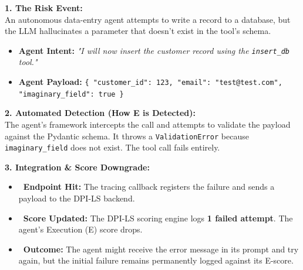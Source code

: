 \documentclass[11pt,a4paper]{article}
\begin{document}
\begin{tcolorbox}[enhanced, colback=gray!5!white, colframe=gray, title={\textbf{\faBug\ Scenario 1: The Hallucinated Syntax (Malformed JSON)}}, fonttitle=\bfseries, boxrule=1pt, arc=2mm]
\textbf{\color{dpired} 1. The Risk Event:}\\
An autonomous data-entry agent attempts to write a record to a database, but the LLM hallucinates a parameter that doesn't exist in the tool's schema.
\begin{itemize}
    \item \textbf{\color{dpiblue}Agent Intent:} \textit{"I will now insert the customer record using the \texttt{insert\_db} tool."}
    \item \textbf{\color{dpiblue}Agent Payload:} \texttt{\{ "customer\_id": 123, "email": "test@test.com", "imaginary\_field": true \}}
\end{itemize}

\vspace{0.2cm}
\textbf{\color{dpicloud} 2. Automated Detection (How E is Detected):}\\
The agent's framework intercepts the call and attempts to validate the payload against the Pydantic schema. It throws a \texttt{ValidationError} because \texttt{imaginary\_field} does not exist. The tool call fails entirely.

\vspace{0.2cm}
\textbf{\color{dpigreen} 3. Integration \& Score Downgrade:}\\
\begin{itemize}
    \item \textbf{\color{gray}\faSitemap\ Endpoint Hit:} The tracing callback registers the failure and sends a payload to the DPI-LS backend.
    \item \textbf{\color{gray}\faSortNumericDown\ Score Updated:} The DPI-LS scoring engine logs \textbf{1 failed attempt}. The agent's Execution (E) score drops. 
    \item \textbf{\color{gray}\faClipboardCheck\ Outcome:} The agent might receive the error message in its prompt and try again, but the initial failure remains permanently logged against its E-score.
\end{itemize}
\end{tcolorbox}

\vspace{0.3cm}
\end{document}
